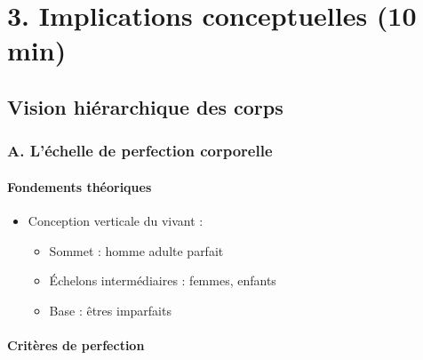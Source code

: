 \documentclass[
  letterpaper,
  DIV=11,
  numbers=noendperiod]{scrreprt}
\providecommand{\tightlist}{%
  \setlength{\itemsep}{0pt}\setlength{\parskip}{0pt}}\usepackage{longtable,booktabs,array}
\begin{document}
\section{}\label{section-4}


\chapter{3. Implications conceptuelles (10
min)}\label{implications-conceptuelles-10-min}

\section{Vision hiérarchique des
corps}\label{vision-hiuxe9rarchique-des-corps}

\subsection{A. L'échelle de perfection
corporelle}\label{a.-luxe9chelle-de-perfection-corporelle}

\subsubsection{Fondements théoriques}\label{fondements-thuxe9oriques}

\begin{itemize}
\tightlist
\item
  Conception verticale du vivant :

  \begin{itemize}
  \tightlist
  \item
    Sommet : homme adulte parfait
  \item
    Échelons intermédiaires : femmes, enfants
  \item
    Base : êtres imparfaits
  \end{itemize}
\end{itemize}

\subsubsection{Critères de perfection}\label{crituxe8res-de-perfection}
\end{document}
